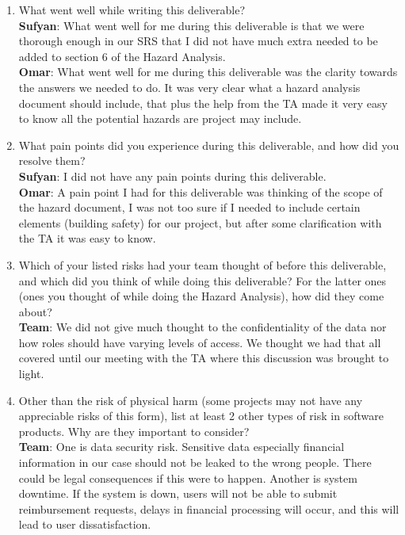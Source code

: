 \documentclass{article}
\begin{document}
\begin{enumerate}
    \item What went well while writing this deliverable? \\ 
    \textbf{Sufyan}: What went well for me during this deliverable is that we were thorough enough in our SRS that I did not have much extra needed to be added to section 6 of the Hazard Analysis. \\
    \textbf{Omar}: What went well for me during this deliverable was the clarity towards the answers we needed to do. It was very clear what a hazard analysis document should include, that plus the help from the TA made it very easy to know all the potential hazards are project may include.  \\

    \item What pain points did you experience during this deliverable, and how
    did you resolve them? \\
    \textbf{Sufyan}: I did not have any pain points during this deliverable. \\
    \textbf{Omar}: A pain point I had for this deliverable was thinking of the scope of the hazard document, I was not too sure if I needed to include certain elements (building safety) for our project, but after some clarification with the TA it was easy to know.  \\

    \item Which of your listed risks had your team thought of before this
    deliverable, and which did you think of while doing this deliverable? For
    the latter ones (ones you thought of while doing the Hazard Analysis), how
    did they come about? \\
    \textbf{Team}: We did not give much thought to the confidentiality of the data nor how roles should have varying levels of access. We thought we had that all covered until our meeting with the TA where this discussion was brought to light.
    \item Other than the risk of physical harm (some projects may not have any
    appreciable risks of this form), list at least 2 other types of risk in
    software products. Why are they important to consider? \\
    \textbf{Team}: One is data security risk. Sensitive data especially financial information in our case should not be leaked to the wrong people. There could be legal consequences if this were to happen. Another is system downtime. If the system is down, users will not be able to submit reimbursement requests, delays in financial processing will occur, and this will lead to user dissatisfaction.
\end{enumerate}
\end{document}
